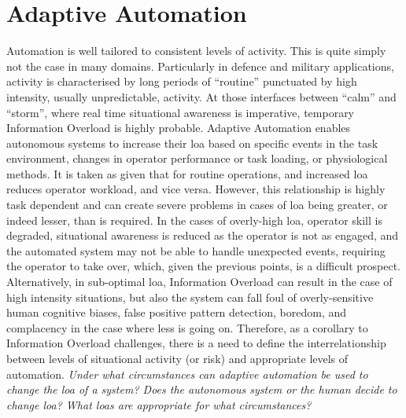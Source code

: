 \section{Adaptive Automation}
Automation is well tailored to consistent levels of activity.
This is quite simply not the case in many domains.
Particularly in defence and military applications, activity is characterised by long periods of ``routine'' punctuated by high intensity, usually unpredictable, activity.
At those interfaces between ``calm'' and ``storm'', where real time situational awareness is imperative, temporary Information Overload is highly probable.
Adaptive Automation enables autonomous systems to increase their \gls{loa} based on specific events in the task environment, changes in operator performance or task loading, or physiological methods.
It is taken as given that for routine operations, and increased \gls{loa} reduces operator workload, and vice versa.
However, this relationship is highly task dependent and can create severe problems in cases of \gls{loa} being greater, or indeed lesser, than is required.
In the cases of overly-high \gls{loa}, operator skill is degraded, situational awareness is reduced as the operator is not as engaged, and the automated system may not be able to handle unexpected events, requiring the operator to take over, which, given the previous points, is a difficult prospect.
Alternatively, in sub-optimal \gls{loa}, Information Overload can result in the case of high intensity situations, but also the system can fall foul of overly-sensitive human cognitive biases, false positive pattern detection, boredom, and complacency in the case where less is going on.
Therefore, as a corollary to Information Overload challenges, there is a need to define the interrelationship between levels of situational activity (or risk) and appropriate levels of automation.
\textit{Under what circumstances can adaptive automation be used to change the \gls{loa} of a system?
Does the autonomous system or the human decide to change \gls{loa}\@? 
What \gls{loa}s are appropriate for what circumstances?}

